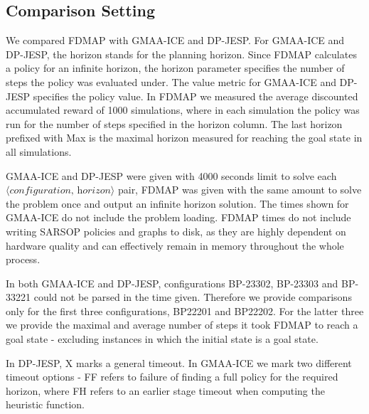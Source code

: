 \documentclass[letterpaper]{article} %
\newcommand{\eliran}[1]{\textbf{[\color{red}ELIRAN:#1]}}
\newcommand{\ronen}[1]{\textbf{[\color{blue}RONEN:#1]}}
\begin{document}
\subsection{Comparison Setting}
We compared FDMAP with GMAA-ICE and DP-JESP. For GMAA-ICE and DP-JESP, the horizon stands for the planning horizon. Since FDMAP calculates a policy for an infinite horizon, the horizon parameter specifies the number of steps the policy was evaluated under.
The value metric for GMAA-ICE and DP-JESP specifies the policy value. In FDMAP we measured the average discounted accumulated reward of 1000 simulations, where in each simulation the policy was run for the number of steps specified in the horizon column. The last horizon prefixed with Max is the maximal horizon measured for reaching the goal state in all simulations.

GMAA-ICE and DP-JESP were given with 4000 seconds limit to solve each $\langle\textit{configuration, horizon}\rangle$ pair, FDMAP was given with the same amount to solve the problem once and output an infinite horizon solution.
The times shown for GMAA-ICE do not include the problem loading. FDMAP times do not include writing SARSOP policies and graphs to disk, as they are highly dependent on hardware quality and can effectively remain in memory throughout the whole process.

In both GMAA-ICE and DP-JESP, configurations BP-23302, BP-23303 and BP-33221 could not be parsed in the time given. Therefore we provide comparisons only for the first three configurations, BP22201 and BP22202. For the latter three we provide the maximal and average number of steps it took FDMAP to reach a goal state - excluding instances in which the initial state is a goal state.

In DP-JESP, X marks a general timeout. In GMAA-ICE we mark two different timeout options - FF refers to failure of finding a full policy for the required horizon, where FH refers to an earlier stage timeout when computing the heuristic function.
\end{document}

